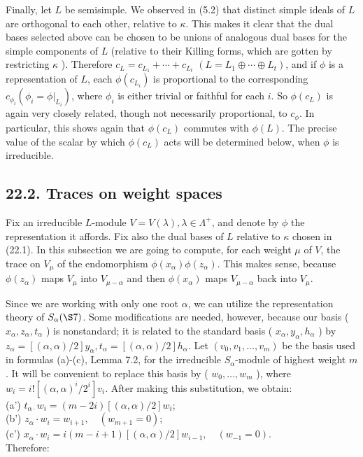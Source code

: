\documentclass[10pt]{article}
\begin{document}
Finally, let $L$ be semisimple. We observed in (5.2) that distinct simple ideals of $L$ are orthogonal to each other, relative to $\kappa$. This makes it clear that the dual bases selected above can be chosen to be unions of analogous dual bases for the simple components of $L$ (relative to their Killing forms, which are gotten by restricting $\kappa$ ). Therefore $c_{L}=c_{L_{1}}+\cdots+c_{L_{t}}$ $\left(L=L_{1} \oplus \cdots \oplus L_{t}\right)$, and if $\phi$ is a representation of $L$, each $\phi\left(c_{L_{i}}\right)$ is proportional to the corresponding $c_{\phi_{i}}\left(\phi_{i}=\left.\phi\right|_{L_{i}}\right)$, where $\phi_{i}$ is either trivial or faithful for each $i$. So $\phi\left(c_{L}\right)$ is again very closely related, though not necessarily proportional, to $c_{\phi}$. In particular, this shows again that $\phi\left(c_{L}\right)$ commutes with $\phi(L)$. The precise value of the scalar by which $\phi\left(c_{L}\right)$ acts will be determined below, when $\phi$ is irreducible.

\subsection*{22.2. Traces on weight spaces}
Fix an irreducible $L$-module $V=V(\lambda), \lambda \in \Lambda^{+}$, and denote by $\phi$ the representation it affords. Fix also the dual bases of $L$ relative to $\kappa$ chosen in (22.1). In this subsection we are going to compute, for each weight $\mu$ of $V$, the trace on $V_{\mu}$ of the endomorphism $\phi\left(x_{\alpha}\right) \phi\left(z_{\alpha}\right)$. This makes sense, because $\phi\left(z_{\alpha}\right)$ maps $V_{\mu}$ into $V_{\mu-\alpha}$ and then $\phi\left(x_{\alpha}\right)$ maps $V_{\mu-\alpha}$ back into $V_{\mu}$.

Since we are working with only one root $\alpha$, we can utilize the representation theory of $S_{\alpha}(\S 7)$. Some modifications are needed, however, because our basis ( $x_{\alpha}, z_{\alpha}, t_{\alpha}$ ) is nonstandard; it is related to the standard basis ( $x_{\alpha}, y_{\alpha}, h_{\alpha}$ ) by $z_{\alpha}=[(\alpha, \alpha) / 2] y_{\alpha}, t_{\alpha}=[(\alpha, \alpha) / 2] h_{\alpha}$. Let $\left(v_{0}, v_{1}, \ldots, v_{m}\right)$ be the basis used in formulas (a)-(c), Lemma 7.2, for the irreducible $S_{\alpha}$-module of highest weight $m$. It will be convenient to replace this basis by ( $w_{0}, \ldots, w_{m}$ ), where $w_{i}=i!\left[(\alpha, \alpha)^{i} / 2^{i}\right] v_{i}$. After making this substitution, we obtain:\\
(a') $t_{\alpha \cdot} w_{i}=(m-2 i)[(\alpha, \alpha) / 2] w_{i}$;\\
(b') $z_{\alpha} \cdot w_{i}=w_{i+1}, \quad\left(w_{m+1}=0\right)$;\\
(c') $x_{\alpha} \cdot w_{i}=i(m-i+1)[(\alpha, \alpha) / 2] w_{i-1}, \quad\left(w_{-1}=0\right)$.\\
Therefore:
\end{document}
